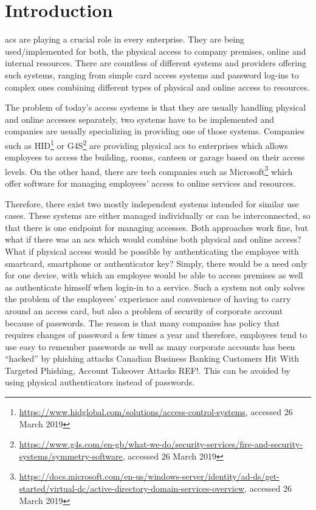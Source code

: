 \section{Introduction}
% 
\acrfull{acs} are playing a crucial role in every enterprise. They are being used/implemented for both, the physical access to company premises, online and internal resources. There are countless of different systems and providers offering such systems, ranging from simple card access systems and password log-ins to complex ones combining different types of physical and online access to resources. 

The problem of today’s access systems is that they are usually handling physical and online accesses separately, two systems have to be implemented and companies are usually specializing in providing one of those systems. Companies such as HID\footnote{\url{https://www.hidglobal.com/solutions/access-control-systems}, accessed 26 March 2019} or G4S\footnote{\url{https://www.g4s.com/en-gb/what-we-do/security-services/fire-and-security-systems/symmetry-software}, accessed 26 March 2019} are providing physical \acrshort{acs} to enterprises which allows employees to access the building, rooms, canteen or garage based on their access levels. On the other hand, there are tech companies such as Microsoft\footnote{\url{https://docs.microsoft.com/en-us/windows-server/identity/ad-ds/get-started/virtual-dc/active-directory-domain-services-overview}, accessed 26 March 2019} which offer software for managing employees’ access to online services and resources.

Therefore, there exist two mostly independent systems intended for similar use cases. These systems are either managed individually or can be interconnected, so that there is one endpoint for managing accesses. Both approaches work fine, but what if there was an \acrshort{acs} which would combine both physical and online access? What if physical access would be possible by authenticating the employee with smartcard, smartphone or authenticator key? Simply, there would be a need only for one device, with which an employee would be able to access premises as well as authenticate himself when login-in to a service. Such a system not only solves the problem of the employees’ experience and convenience of having to carry around an access card, but also a problem of security of corporate account because of passwords. The reason is that many companies has policy that requires changes of password a few times a year and therefore, employees tend to use easy to remember passwords  as well as many corporate accounts has been “hacked” by phishing attacks\cite{} Canadian Business Banking Customers Hit With Targeted Phishing, Account Takeover Attacks REF!. This can be avoided by using physical authenticators instead of passwords.

